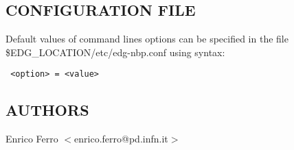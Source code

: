 \subsection*{CONFIGURATION FILE\label{edg-installfe_CONFIGURATION_FILE}}


Default values of command lines options can be specified in the file
\$EDG\_LOCATION/etc/edg-nbp.conf using syntax:

\begin{verbatim}
 <option> = <value>
\end{verbatim}
\subsection*{AUTHORS\label{edg-installfe_AUTHORS}}


Enrico Ferro $<$enrico.ferro@pd.infn.it$>$

